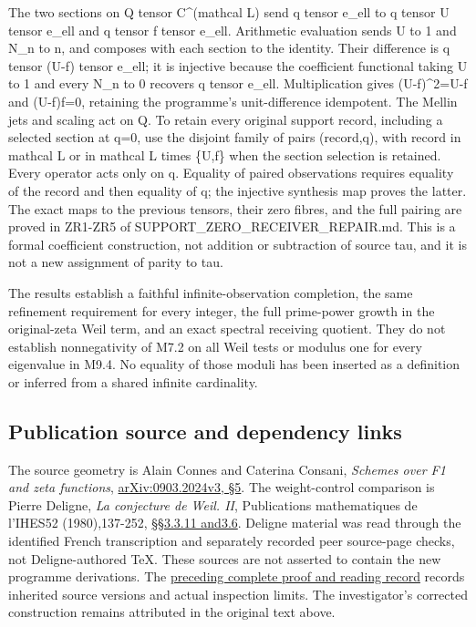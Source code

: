 The two sections on Q tensor C\^{}(mathcal L) send q tensor e\_ell to q
tensor U tensor e\_ell and q tensor f tensor e\_ell. Arithmetic
evaluation sends U to 1 and N\_n to n, and composes with each section to
the identity. Their difference is q tensor (U-f) tensor e\_ell; it is
injective because the coefficient functional taking U to 1 and every
N\_n to 0 recovers q tensor e\_ell. Multiplication gives (U-f)\^{}2=U-f
and (U-f)f=0, retaining the programme's unit-difference idempotent. The
Mellin jets and scaling act on Q. To retain every original support
record, including a selected section at q=0, use the disjoint family of
pairs (record,q), with record in mathcal L or in mathcal L times \{U,f\}
when the section selection is retained. Every operator acts only on q.
Equality of paired observations requires equality of the record and then
equality of q; the injective synthesis map proves the latter. The exact
maps to the previous tensors, their zero fibres, and the full pairing
are proved in ZR1-ZR5 of SUPPORT\_ZERO\_RECEIVER\_REPAIR.md. This is a
formal coefficient construction, not addition or subtraction of source
tau, and it is not a new assignment of parity to tau.

The results establish a faithful infinite-observation completion, the
same refinement requirement for every integer, the full prime-power
growth in the original-zeta Weil term, and an exact spectral receiving
quotient. They do not establish nonnegativity of M7.2 on all Weil tests
or modulus one for every eigenvalue in M9.4. No equality of those moduli
has been inserted as a definition or inferred from a shared infinite
cardinality.

\subsection{Publication source and dependency
links}\label{publication-source-and-dependency-links}

The source geometry is Alain Connes and Caterina Consani, \emph{Schemes
over F1 and zeta functions},
\href{https://arxiv.org/abs/0903.2024v3}{arXiv:0903.2024v3, §5}. The
weight-control comparison is Pierre Deligne, \emph{La conjecture de
Weil. II}, Publications mathematiques de l'IHES52 (1980),137-252,
\href{https://www.numdam.org/item/PMIHES_1980__52__137_0/}{§§3.3.11
and3.6}. Deligne material was read through the identified French
transcription and separately recorded peer source-page checks, not
Deligne-authored TeX. These sources are not asserted to contain the new
programme derivations. The
\href{https://github.com/KokunoYumeto/zeta-function-research-reader/blob/36a82ecca98addb8a98b48204e349737856c7223/workbenches/splitzero-tandem/continuations/20260924-cohomology-weight-and-character-lifts/BUILD_AND_REVIEW.md}{preceding
complete proof and reading record} records inherited source versions and
actual inspection limits. The investigator's corrected construction
remains attributed in the original text above.
